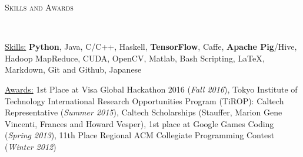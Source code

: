 \documentclass[9pt]{article}
\newenvironment{changemargin}[2]{%
  \begin{list}{}{%
    \setlength{\topsep}{0pt}%
    \setlength{\leftmargin}{#1}%
    \setlength{\rightmargin}{#2}%
    \setlength{\listparindent}{\parindent}%
    \setlength{\itemindent}{\parindent}%
    \setlength{\parsep}{\parskip}%
  }%
  \item[]}{\end{list}
}
\newcommand{\lineover}{
	\begin{changemargin}{-0.05in}{-0.05in}
		\vspace*{-8pt}
		\hrulefill \\
		\vspace*{-2pt}
	\end{changemargin}
}
\newcommand{\header}[1]{
	\begin{changemargin}{-0.5in}{-0.5in}
		\scshape{#1}\\
  	\lineover
	\end{changemargin}
}
\newenvironment{body} {
	\vspace*{-16pt}
	\begin{changemargin}{-0.25in}{-0.5in}
  }	
	{\end{changemargin}
}
\begin{document}
\header{Skills and Awards}
\smallskip
\begin{body}
	\vspace{14pt}
	
		\uline{Skills:} \textbf{Python}, Java, C/C++, Haskell, \textbf{TensorFlow}, Caffe, \textbf{Apache Pig}/Hive, Hadoop MapReduce, CUDA, OpenCV, Matlab, Bash Scripting, \LaTeX, Markdown, Git and Github, Japanese\\
    
	\medskip
	
	\uline{Awards:} 1st Place at Visa Global Hackathon 2016 (\emph{Fall 2016}), 
    				Tokyo Institute of Technology International Research Opportunities Program (TiROP): Caltech Representative (\emph{Summer 2015}), 
                    Caltech Scholarships (Stauffer, Marion Gene Vincenti, Frances and Howard Vesper),
        1st place at Google Games Coding (\emph{Spring 2013}),
        11th Place Regional ACM Collegiate Programming Contest (\emph{Winter 2012})
	
	
%
\end{body}
\end{document}
